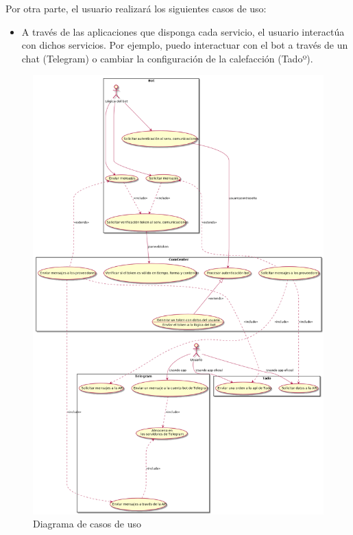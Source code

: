 \documentclass[spanish,12pt, a4paper, twoside]{paper}
\begin{document}
Por otra parte, el usuario realizará los siguientes casos de uso:

\begin{itemize}
\item A través de las aplicaciones que disponga cada servicio, el usuario interactúa con dichos servicios. Por ejemplo, puedo interactuar con el bot a través de un chat (Telegram) o cambiar la configuración de la calefacción (Tadoº).
\end{itemize}

\begin{figure}
\centering
	\includegraphics[width=\textwidth]{recursos/usecases}
\caption{Diagrama de casos de uso}
\label{fig:Diagrama de casos de uso}
\end{figure}
\end{document}
